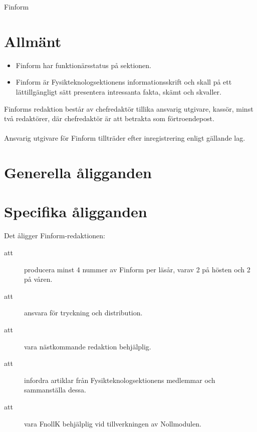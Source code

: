 \documentclass[a4paper]{article}
\begin{document}
\renewcommand{\forening}{Finform} %

\begin{foreningenv}{\forening{}} %
    \section{Allmänt}
    \begin{itemize}
        \item Finform har funktionärsstatus på sektionen.
        \item Finform är Fysikteknologsektionens informationsskrift och skall på ett lättillgängligt sätt presentera intressanta fakta, skämt och skvaller.
    \end{itemize}
    
    Finforms redaktion består av chefredaktör tillika ansvarig utgivare, kassör, minst två redaktörer, %
    där chefredaktör är att betrakta som förtroendepost. \\ \\
    Ansvarig utgivare för Finform tillträder efter inregistrering enligt gällande lag.\\
    
    \section{Generella åligganden}
    \aliggsektfunkt{}
        
    \section{Specifika åligganden}
    Det åligger \forening{}-redaktionen:
    \begin{description}
        \item[att] producera minst 4 nummer av Finform per läsår, varav 2 på hösten och 2 på våren.
        \item[att] ansvara för tryckning och distribution.
        \item[att] vara nästkommande redaktion behjälplig.
        \item[att] infordra artiklar från Fysikteknologsektionens medlemmar och sammanställa dessa.
        \item[att] vara FnollK behjälplig vid tillverkningen av Nollmodulen.
    \end{description}
    

\end{foreningenv}
\end{document}
